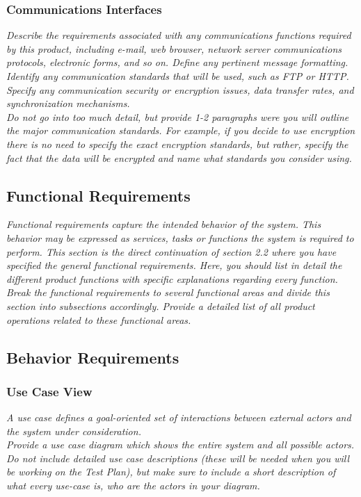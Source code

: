 \documentclass{article}
\newcommand{\gnl}{\vspace{1em}\\}      %
\begin{document}
        \subsubsection{Communications Interfaces}
            \emph{Describe the requirements associated with any communications functions required by this product, including e-mail, web browser, network server communications protocols, electronic forms, and so on. Define any pertinent message formatting. Identify any communication standards that will be used, such as FTP or HTTP. Specify any communication security or encryption issues, data transfer rates, and synchronization mechanisms.\gnl Do not go into too much detail, but provide 1-2 paragraphs were you will outline the major communication standards. For example, if you decide to use encryption there is no need to specify the exact encryption standards, but rather, specify the fact that the data will be encrypted and name what standards you consider using.}
    \subsection{Functional Requirements}
        \emph{Functional requirements capture the intended behavior of the system. This behavior may be expressed as services, tasks or functions the system is required to perform. This section is the direct continuation of section 2.2 where you have specified the general functional requirements. Here, you should list in detail the different product functions with specific explanations regarding every function.\gnl Break the functional requirements to several functional areas and divide this section into subsections accordingly. Provide a detailed list of all product operations related to these functional areas.}
    \subsection{Behavior Requirements}
        \subsubsection{Use Case View}
            \emph{A use case defines a goal-oriented set of interactions between external actors and the system under consideration.\gnl Provide a use case diagram which shows the entire system and all possible actors. Do not include detailed use case descriptions (these will be needed when you will be working on the Test Plan), but make sure to include a short description of what every use-case is, who are the actors in your diagram.}
\end{document}
